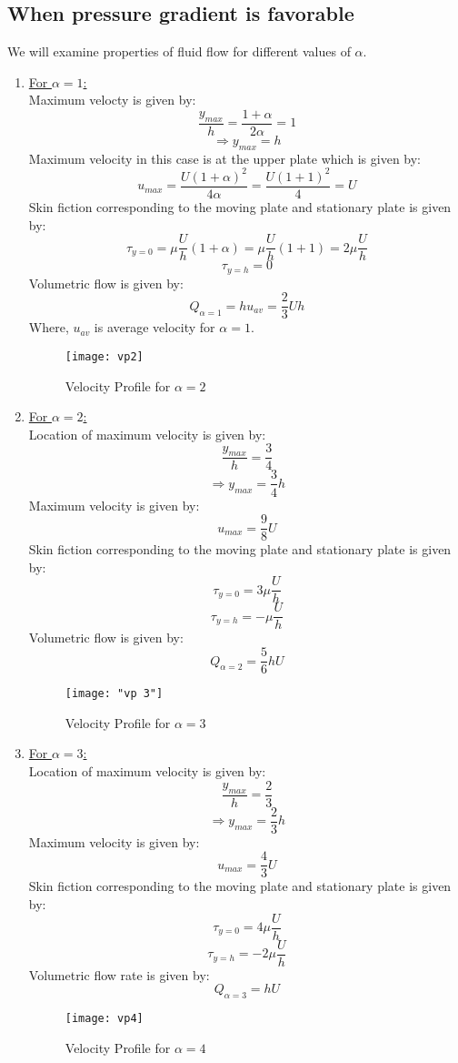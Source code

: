 \documentclass[14pt,one side, a4paper]{extbook}
\begin{document}
	 	\subsection{When pressure gradient is favorable }
	 	We will examine properties of fluid flow for different values of $\alpha$.
	 	\begin{enumerate}
	 		\begin{figure}[ht]
	 			\centering
	 			\texttt{[image: vp1]}
	 			\caption{Velocity Profile for $\alpha=1$}
	 			\label{fig:vp1}
	 		\end{figure}
	 		\item {\underline{For $\alpha=1$:}}
	 		\\Maximum velocty is given by:
	 		$$\frac{y_{max}}{h}=\frac{1+\alpha}{2\alpha}=1$$
	 		$$\Longrightarrow y_{max}=h$$
	 		Maximum velocity in this case is at the upper plate which is given by:
	 		$$u_{max}=\frac{U(1+\alpha)^2}{4\alpha}=\frac{U(1+1)^{2}}{4}=U$$
	 		Skin fiction corresponding to the moving plate and stationary plate is given by:
	 		$$\tau_{y=0}=\mu\frac{U}{h}(1+\alpha)=\mu\frac{U}{h}(1+1)=2\mu\frac{U}{h}$$
	 		$$\tau_{y=h}=0$$
	 		Volumetric flow is given by:
	 		$$Q_{\alpha=1}=hu_{av}=\frac{2}{3}Uh$$Where, $u_{av}$ is average velocity for $\alpha=1$.
	 		\begin{figure}[ht]
	 			\centering
	 			\texttt{[image: vp2]}
	 			\caption{Velocity Profile for $\alpha=2$}
	 			\label{fig:vp2}
	 		\end{figure}
	 		
	 		\item{\underline{For $\alpha=2$:}}
	 		\\Location of maximum velocity is given by:
	 		$$\frac{y_{max}}{h}=\frac{3}{4}$$
	 		$$\Longrightarrow y_{max}=\frac{3}{4}h$$
	 		Maximum velocity is given by:
	 		$$u_{max}=\frac{9}{8}U$$
	 		Skin fiction corresponding to the moving plate and stationary plate is given by:
	 		$$\tau_{y=0}=3\mu\frac{U}{h}$$
	 		$$\tau_{y=h}=-\mu\frac{U}{h}$$
	 		Volumetric flow is given by:
	 		$$Q_{\alpha =2}=\frac{5}{6}hU$$
	 		\begin{figure}[ht]
	 			\centering
	 			\texttt{[image: "vp 3"]}
	 			\caption{Velocity Profile for $\alpha=3$}
	 			\label{fig:vp3}
	 		\end{figure}
	 		
	 		\item {\underline{For $\alpha=3$:}}
	 		\\Location of maximum velocity is given by:
	 		$$\frac{y_{max}}{h}=\frac{2}{3}$$
	 		$$\Longrightarrow y_{max}=\frac{2}{3}h$$
	 		Maximum velocity is given by:
	 		$$u_{max}=\frac{4}{3}U$$
	 		Skin fiction corresponding to the moving plate and stationary plate is given by:
	 		$$\tau_{y=0}=4\mu\frac{U}{h}$$
	 		$$\tau_{y=h}=-2\mu\frac{U}{h}$$
	 		Volumetric flow rate is given by:
	 		$$Q_{\alpha=3}=hU$$
	 		\begin{figure}[ht]
	 			\centering
	 			\texttt{[image: vp4]}
	 			\caption{Velocity Profile for $\alpha=4$}
	 			\label{fig:vp4}
	 		\end{figure}
	 		

\end{enumerate}
\end{document}
